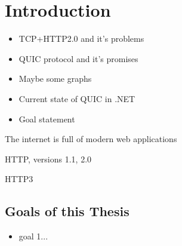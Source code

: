 \chapter{Introduction}

\begin{itemize}
  \item TCP+HTTP2.0 and it's problems
  \item QUIC protocol and it's promises
  \item Maybe some graphs
  \item Current state of QUIC in .NET
  \item Goal statement
\end{itemize}

The internet is full of modern web applications

HTTP, versions 1.1, 2.0

HTTP3

\section{Goals of this Thesis}

\begin{itemize}
  \item goal 1...
\end{itemize}
